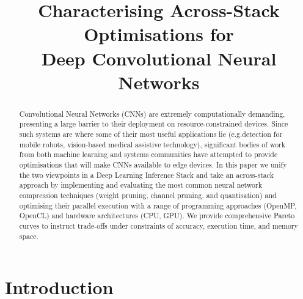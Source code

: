 \documentclass[conference]{IEEEtran}
\begin{document}
\title{Characterising Across-Stack Optimisations for \\ Deep Convolutional Neural Networks}


\author{
}

\maketitle



\begin{abstract}

Convolutional Neural Networks (CNNs) are extremely computationally demanding, presenting a large barrier to their deployment on resource-constrained devices. Since such systems are where some of their most useful applications lie (e.g.\obstacle detection for mobile robots, vision-based medical assistive technology), significant bodies of work from both machine learning and systems communities have attempted to provide optimisations that will make CNNs available to edge devices. In this paper we unify the two viewpoints in a Deep Learning Inference Stack and take an across-stack approach by implementing and evaluating the most common neural network compression techniques (weight pruning, channel pruning, and quantisation) and optimising their parallel execution with a range of programming approaches (OpenMP, OpenCL) and hardware architectures (CPU, GPU). We provide comprehensive Pareto curves to instruct trade-offs under constraints of accuracy, execution time, and memory space.
\end{abstract}


\IEEEpeerreviewmaketitle

\section{Introduction}
\end{document}
